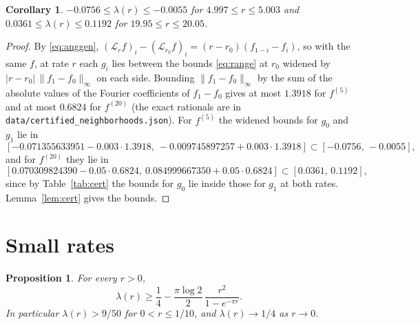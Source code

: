 \documentclass[11pt]{amsart}
\newtheorem{proposition}[theorem]{Proposition}
\newtheorem{corollary}[theorem]{Corollary}
\newcommand{\cL}{\mathcal{L}}
\newcommand{\file}[1]{\nolinkurl{#1}}
\begin{document}
\begin{corollary}\label{cor:nbhd}
$-0.0756\le\lambda(r)\le-0.0055$ for $4.997\le r\le5.003$ and $0.0361\le\lambda(r)\le0.1192$ for $19.95\le r\le20.05$.
\end{corollary}

\begin{proof}
By \eqref{eq:anggen}, $(\cL_rf)_i-(\cL_{r_0}f)_i=(r-r_0)(f_{1-i}-f_i)$, so with the same $f$, at rate $r$ each $g_i$ lies between the bounds
\eqref{eq:range} at $r_0$ widened by $|r-r_0|\,\|f_1-f_0\|_\infty$ on each side. Bounding $\|f_1-f_0\|_\infty$ by the sum
of the absolute values of the Fourier coefficients of $f_1-f_0$ gives at most $1.3918$ for $f^{(5)}$ and at most
$0.6824$ for $f^{(20)}$ (the exact rationals are in \file{data/certified_neighborhoods.json}). For $f^{(5)}$ the widened bounds for $g_0$ and $g_1$ lie in
\[
[-0.071355633951-0.003\cdot1.3918,\ -0.009745897257+0.003\cdot1.3918]\subset[-0.0756,\,-0.0055],
\]
and for $f^{(20)}$ they lie in
\[
[0.070309824390-0.05\cdot0.6824,\ 0.084999667350+0.05\cdot0.6824]\subset[0.0361,\,0.1192],
\]
since by Table~\ref{tab:cert} the bounds for $g_0$ lie inside those for $g_1$ at both rates. Lemma~\ref{lem:cert} gives
the bounds.
\end{proof}

\section{Small rates}\label{sec:small}

\begin{proposition}\label{prop:small}
For every $r>0$,
\begin{equation}\label{eq:small}
\lambda(r)\ge\frac14-\frac{\pi\log2}{2}\,\frac{r^2}{1-e^{-\pi r}} .
\end{equation}
In particular $\lambda(r)>9/50$ for $0<r\le1/10$, and $\lambda(r)\to1/4$ as $r\to0$.
\end{proposition}
\end{document}

